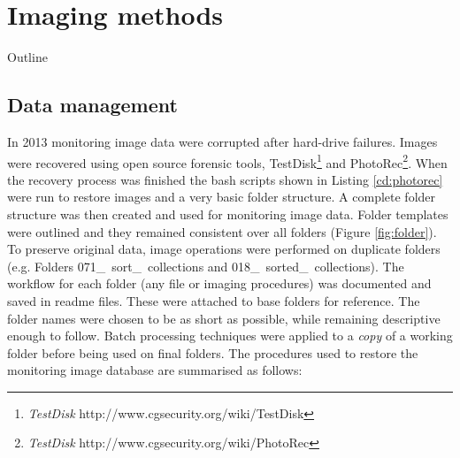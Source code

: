 \chapter{Imaging methods}\label{ch4:Imaging-methods}
\begin{remark}{Outline}
\end{remark}

\section{Data management}\label{sec:image-data-management}
In 2013 monitoring image data were corrupted after hard-drive failures. Images were recovered using open source forensic tools, TestDisk\footnote{\emph{TestDisk} http://www.cgsecurity.org/wiki/TestDisk} and PhotoRec\footnote{\emph{TestDisk }http://www.cgsecurity.org/wiki/PhotoRec}. When the recovery process was finished the bash scripts shown in Listing \ref{cd:photorec} were run to restore images and a very basic folder structure. A complete folder structure was then created and used for monitoring image data. Folder templates were outlined and they remained consistent over all folders (Figure \ref{fig:folder}). To preserve original data, image operations were performed on duplicate folders (e.g. Folders 071\_~sort\_~collections and 018\_~sorted\_~collections). The workflow for each folder (any file or imaging procedures) was documented and saved in readme files. These were attached to base folders for reference. The folder names were chosen to be as short as possible, while remaining descriptive enough to follow. Batch processing techniques were applied to a \emph{copy} of a working folder before being used on final folders. The procedures used to restore the monitoring image database are summarised as follows:

